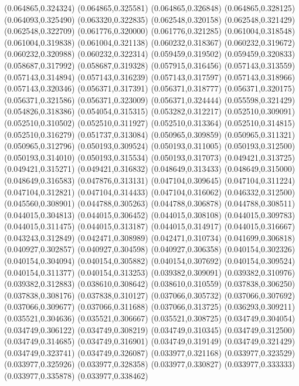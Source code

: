 (0.064865,0.324324)
(0.064865,0.325581)
(0.064865,0.326848)
(0.064865,0.328125)
(0.064093,0.325490)
(0.063320,0.322835)
(0.062548,0.320158)
(0.062548,0.321429)
(0.062548,0.322709)
(0.061776,0.320000)
(0.061776,0.321285)
(0.061004,0.318548)
(0.061004,0.319838)
(0.061004,0.321138)
(0.060232,0.318367)
(0.060232,0.319672)
(0.060232,0.320988)
(0.060232,0.322314)
(0.059459,0.319502)
(0.059459,0.320833)
(0.058687,0.317992)
(0.058687,0.319328)
(0.057915,0.316456)
(0.057143,0.313559)
(0.057143,0.314894)
(0.057143,0.316239)
(0.057143,0.317597)
(0.057143,0.318966)
(0.057143,0.320346)
(0.056371,0.317391)
(0.056371,0.318777)
(0.056371,0.320175)
(0.056371,0.321586)
(0.056371,0.323009)
(0.056371,0.324444)
(0.055598,0.321429)
(0.054826,0.318386)
(0.054054,0.315315)
(0.053282,0.312217)
(0.052510,0.309091)
(0.052510,0.310502)
(0.052510,0.311927)
(0.052510,0.313364)
(0.052510,0.314815)
(0.052510,0.316279)
(0.051737,0.313084)
(0.050965,0.309859)
(0.050965,0.311321)
(0.050965,0.312796)
(0.050193,0.309524)
(0.050193,0.311005)
(0.050193,0.312500)
(0.050193,0.314010)
(0.050193,0.315534)
(0.050193,0.317073)
(0.049421,0.313725)
(0.049421,0.315271)
(0.049421,0.316832)
(0.048649,0.313433)
(0.048649,0.315000)
(0.048649,0.316583)
(0.047876,0.313131)
(0.047104,0.309645)
(0.047104,0.311224)
(0.047104,0.312821)
(0.047104,0.314433)
(0.047104,0.316062)
(0.046332,0.312500)
(0.045560,0.308901)
(0.044788,0.305263)
(0.044788,0.306878)
(0.044788,0.308511)
(0.044015,0.304813)
(0.044015,0.306452)
(0.044015,0.308108)
(0.044015,0.309783)
(0.044015,0.311475)
(0.044015,0.313187)
(0.044015,0.314917)
(0.044015,0.316667)
(0.043243,0.312849)
(0.042471,0.308989)
(0.042471,0.310734)
(0.041699,0.306818)
(0.040927,0.302857)
(0.040927,0.304598)
(0.040927,0.306358)
(0.040154,0.302326)
(0.040154,0.304094)
(0.040154,0.305882)
(0.040154,0.307692)
(0.040154,0.309524)
(0.040154,0.311377)
(0.040154,0.313253)
(0.039382,0.309091)
(0.039382,0.310976)
(0.039382,0.312883)
(0.038610,0.308642)
(0.038610,0.310559)
(0.037838,0.306250)
(0.037838,0.308176)
(0.037838,0.310127)
(0.037066,0.305732)
(0.037066,0.307692)
(0.037066,0.309677)
(0.037066,0.311688)
(0.037066,0.313725)
(0.036293,0.309211)
(0.035521,0.304636)
(0.035521,0.306667)
(0.035521,0.308725)
(0.034749,0.304054)
(0.034749,0.306122)
(0.034749,0.308219)
(0.034749,0.310345)
(0.034749,0.312500)
(0.034749,0.314685)
(0.034749,0.316901)
(0.034749,0.319149)
(0.034749,0.321429)
(0.034749,0.323741)
(0.034749,0.326087)
(0.033977,0.321168)
(0.033977,0.323529)
(0.033977,0.325926)
(0.033977,0.328358)
(0.033977,0.330827)
(0.033977,0.333333)
(0.033977,0.335878)
(0.033977,0.338462)
